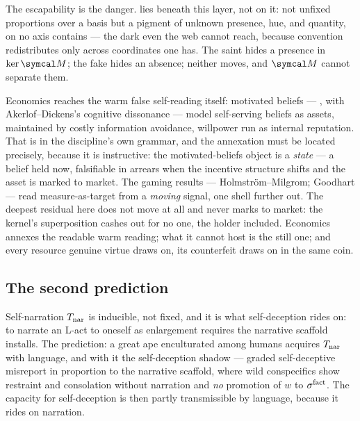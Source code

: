 \documentclass[../main]{subfiles}
\begin{document}
The escapability is the danger.  lies beneath this layer, not on it: not unfixed
proportions over a basis but a pigment of unknown presence, hue, and quantity, on no axis
 contains --- the dark even the web cannot reach, because convention
redistributes only across coordinates one has. The saint hides a presence in $\ker\readout$;
the fake hides an absence; neither moves, and $\readout$ cannot separate them.

\begin{econ}[label=e:goodhart, title={Motivated beliefs reach the warm reading; the residual does not move},
  ref=op:recess, cites={a:benaboutirole,a:goodhart}, departs=annex,
  stopsat={the falsified object is a state --- a belief, readable in arrears when the incentive shifts; the residual here never moves}]
  Economics reaches the warm false self-reading itself: motivated beliefs ---
  \textcite{a:benaboutirole}, with Akerlof--Dickens's cognitive dissonance --- model
  self-serving beliefs as assets, maintained by costly information avoidance, willpower
  run as internal reputation. That is  in the discipline's own grammar,
  and the annexation must be located precisely, because it is instructive: the
  motivated-beliefs object is a \emph{state} --- a belief held now, falsifiable in
  arrears when the incentive structure shifts and the asset is marked to market. The
  gaming results --- Holmstr\"om--Milgrom; Goodhart \parencite{a:goodhart} --- read
  measure-as-target from a \emph{moving} signal, one shell further out. The deepest
  residual here does not move at all and never marks to market: the kernel's
  superposition cashes out for no one, the holder included. Economics annexes the
  readable warm reading; what it cannot host is the still one; and every resource
  genuine virtue draws on, its counterfeit draws on in the same coin.
\end{econ}

\subsection{The second prediction}
\label{subsec:decep:second-prediction}
%
Self-narration $T\sb{\mathrm{nar}}$ is inducible, not fixed, and it is what self-deception rides on: to
narrate an L-act to oneself as enlargement requires the narrative scaffold
 installs. The prediction: a great ape enculturated among humans acquires
$T\sb{\mathrm{nar}}$ with language, and with it the self-deception shadow --- graded self-deceptive
misreport in proportion to the narrative scaffold, where wild conspecifics show restraint and
consolation without narration and \emph{no} promotion of $w$ to $\sigma\sp{\mathrm{fact}}$. The
capacity for self-deception is then partly transmissible by language, because it rides on
narration.
\end{document}
